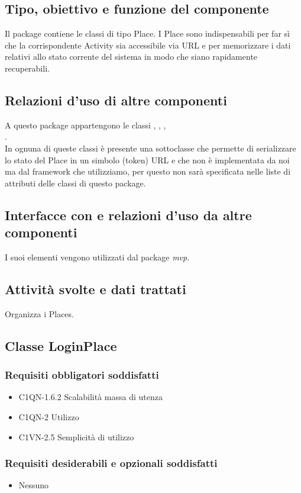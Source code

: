 \subsection*{Tipo, obiettivo e funzione del componente}
Il package contiene le classi di tipo Place. I Place sono indispensabili
per far s\`i che la corrispondente Activity sia accessibile via URL e per
memorizzare i dati relativi allo stato corrente del sistema in modo che siano
rapidamente recuperabili. 
\subsection*{Relazioni d'uso di altre componenti} A
questo package appartengono le classi , ,
, \\.\\
In ognuna di queste classi \`e presente una sottoclasse  che
permette di serializzare lo stato del Place in un simbolo (token) URL e che non
\`e implementata da noi ma dal framework che utilizziamo, per questo non sar\`a
specificata nelle liste di attributi delle classi di questo package.
\subsection*{Interfacce con
e relazioni d'uso da altre componenti} I suoi elementi vengono utilizzati dal package \emph{mvp}. 
\subsection*{Attivit\`a svolte e dati trattati} Organizza i Places.

\subsection{Classe LoginPlace}
\subsubsection*{Requisiti obbligatori soddisfatti}
\begin{itemize}
	\item C1QN-1.6.2 Scalabilit\`a massa di utenza
	\item C1QN-2 Utilizzo
	\item C1VN-2.5 Semplicit\`a di utilizzo
\end{itemize}
\subsubsection*{Requisiti desiderabili e opzionali soddisfatti}
\begin{itemize}
    \item Nessuno
\end{itemize}
